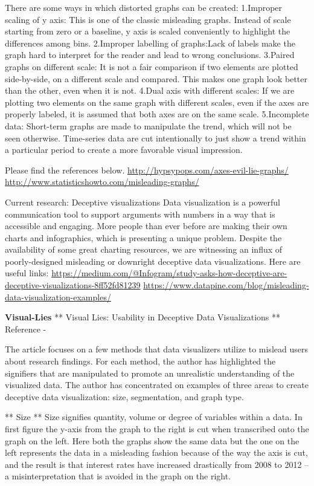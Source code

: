 \documentclass[]{book}
\theoremstyle{definition}
\theoremstyle{definition}
\theoremstyle{definition}
\theoremstyle{remark}
\begin{document}
There are some ways in which distorted graphs can be created: 1.Improper
scaling of y axis: This is one of the classic misleading graphs. Instead
of scale starting from zero or a baseline, y axis is scaled conveniently
to highlight the differences among bins. 2.Improper labelling of
graphs:Lack of labels make the graph hard to interpret for the reader
and lead to wrong conclusions. 3.Paired graphs on different scale: It is
not a fair comparison if two elements are plotted side-by-side, on a
different scale and compared. This makes one graph look better than the
other, even when it is not. 4.Dual axis with different scales: If we are
plotting two elements on the same graph with different scales, even if
the axes are properly labeled, it is assumed that both axes are on the
same scale. 5.Incomplete data: Short-term graphs are made to manipulate
the trend, which will not be seen otherwise. Time-series data are cut
intentionally to just show a trend within a particular period to create
a more favorable visual impression.

Please find the references below.
\url{http://hypsypops.com/axes-evil-lie-graphs/}
\url{http://www.statisticshowto.com/misleading-graphs/}

Current research: Deceptive visualizations Data visualization is a
powerful communication tool to support arguments with numbers in a way
that is accessible and engaging. More people than ever before are making
their own charts and infographics, which is presenting a unique problem.
Despite the availability of some great charting resources, we are
witnessing an influx of poorly-designed misleading or downright
deceptive data visualizations. Here are useful links:
\url{https://medium.com/@Infogram/study-asks-how-deceptive-are-deceptive-visualizations-8ff52fd81239}
\url{https://www.datapine.com/blog/misleading-data-visualization-examples/}

\textbf{Visual-Lies} ** Visual Lies: Usability in Deceptive Data
Visualizations ** Reference - \citep{visual-lies}

The article focuses on a few methods that data visualizers utilize to
mislead users about research findings. For each method, the author has
highlighted the signifiers that are manipulated to promote an
unrealistic understanding of the visualized data. The author has
concentrated on examples of three areas to create deceptive data
visualization: size, segmentation, and graph type.

** Size ** Size signifies quantity, volume or degree of variables within
a data. In first figure the y-axis from the graph to the right is cut
when transcribed onto the graph on the left. Here both the graphs show
the same data but the one on the left represents the data in a
misleading fashion because of the way the axis is cut, and the result is
that interest rates have increased drastically from 2008 to 2012 -- a
misinterpretation that is avoided in the graph on the right.
\end{document}
